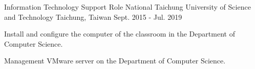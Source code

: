 \begin{cventries}
  \cventry
    {Information Technology Support Role} %
    {National Taichung University of Science and Technology} %
    {Taichung, Taiwan} %
    {Sept. 2015 - Jul. 2019} %
    {
      \begin{cvitems} %
        \item {Install and configure the computer of the classroom in the Department of Computer Science.}
        \item {Management VMware server on the Department of Computer Science.}
      \end{cvitems}
    }
    
\end{cventries}